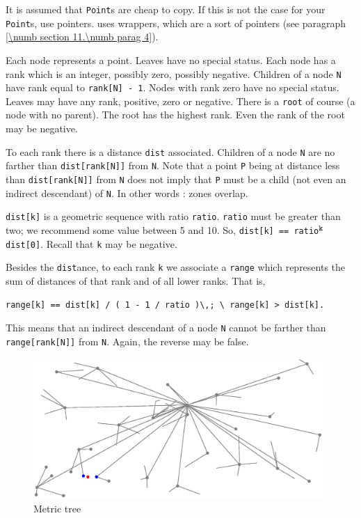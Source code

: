 It is assumed that {\small\tt Point}s are cheap to copy.
If this is not the case for your {\small\tt Point}s, use pointers.
{\ManiFEM} uses wrappers, which are a sort of pointers (see paragraph
\ref{\numb section 11.\numb parag 4}).

Each node represents a point.
Leaves have no special status.
Each node has a rank which is an integer, possibly zero, possibly negative.
Children of a node {\small\tt N} have rank equal to {\small\tt rank[N] - 1}.
Nodes with rank zero have no special status.
Leaves may have any rank, positive, zero or negative.
There is a {\small\tt root} of course (a node with no parent).
The root has the highest rank.
Even the rank of the root may be negative.

To each rank there is a distance {\small\tt dist} associated.
Children of a node {\small\tt N} are no farther than {\small\tt dist[rank[N]]} from {\small\tt N}.
Note that a point {\small\tt P} being at distance less than {\small\tt dist[rank[N]]} from
{\small\tt N} does not imply that {\small\tt P} must be a child (not even an indirect descendant)
of {\small\tt N}.
In other words : zones overlap.

{\small\tt dist[k]} is a geometric sequence with ratio {\small\tt ratio}.
{\small\tt ratio} must be greater than two; we recommend some value between 5 and 10.
So, {\small\tt dist[k] == ratio}$^{\hbox{\footnotesize\tt k }}${\small\tt dist[0]}.
Recall that {\small\tt k} may be negative.

Besides the {\small\tt dist}ance, to each rank {\small\tt k} we associate a {\small\tt range}
which represents the sum of distances of that rank and of all lower ranks.
That is,
\begin{Verbatim}[commandchars=\\\{\},formatcom=\small\tt,baselinestretch=0.94]
   range[k] == dist[k] / ( 1 - 1 / ratio )\,; \ range[k] > dist[k].
\end{Verbatim}
\noindent This means that an indirect descendant of a node {\small\tt N} cannot be farther than
{\small\tt range[rank[N]]} from {\small\tt N}.
Again, the reverse may be false.

\begin{figure}[ht] \centering
  \includegraphics[width=110mm]{metric-tree}
  \caption{Metric tree}
  \label{\numb section 11.\numb fig 3}
\end{figure}

